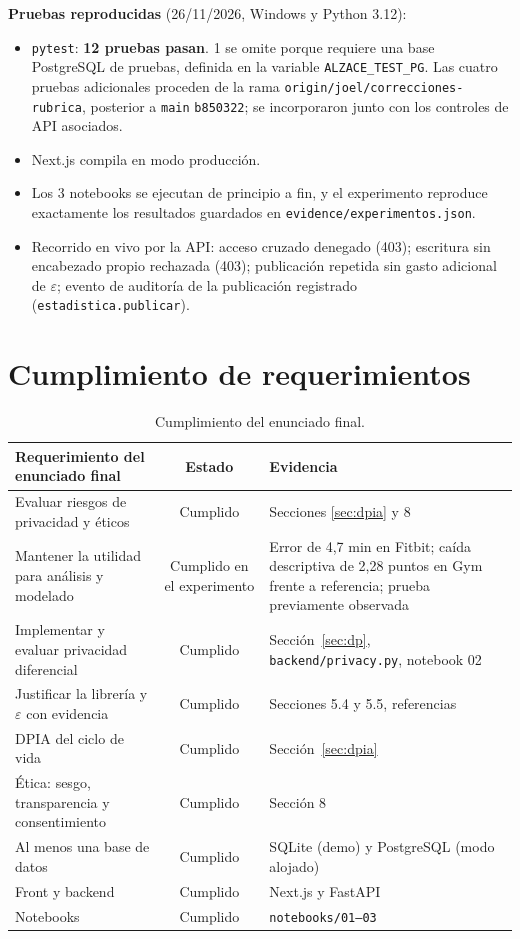 \documentclass[11pt]{article}
\begin{document}
\textbf{Pruebas reproducidas} (26/11/2026, Windows y Python 3.12):
\begin{itemize}[nosep]
  \item \texttt{pytest}: \textbf{12 pruebas pasan}. 1 se omite porque requiere una base PostgreSQL de pruebas, definida en la variable \texttt{ALZACE\_TEST\_PG}. Las cuatro pruebas adicionales proceden de la rama \texttt{origin/joel/correcciones-rubrica}, posterior a \texttt{main} \texttt{b850322}; se incorporaron junto con los controles de API asociados.
  \item Next.js compila en modo producción.
  \item Los 3 notebooks se ejecutan de principio a fin, y el experimento reproduce exactamente los resultados guardados en \texttt{evidence/experimentos.json}.
  \item Recorrido en vivo por la API: acceso cruzado denegado (403); escritura sin encabezado propio rechazada (403); publicación repetida sin gasto adicional de $\varepsilon$; evento de auditoría de la publicación registrado (\texttt{estadistica.\allowbreak publicar}).
\end{itemize}

\section{Cumplimiento de requerimientos}
\label{sec:cumplimiento}

\begin{table}[H]
\centering\small
\begin{tabularx}{\textwidth}{@{}p{6cm}cY@{}}
\toprule
\textbf{Requerimiento del enunciado final} & \textbf{Estado} & \textbf{Evidencia} \\
\midrule
Evaluar riesgos de privacidad y éticos & Cumplido & Secciones \ref{sec:dpia} y 8 \\
Mantener la utilidad para análisis y modelado & Cumplido en el experimento & Error de 4,7 min en Fitbit; caída descriptiva de 2,28 puntos en Gym frente a referencia; prueba previamente observada \\
Implementar y evaluar privacidad diferencial & Cumplido & Sección~\ref{sec:dp}, \texttt{backend/privacy.py}, notebook 02 \\
Justificar la librería y $\varepsilon$ con evidencia & Cumplido & Secciones 5.4 y 5.5, referencias \\
DPIA del ciclo de vida & Cumplido & Sección~\ref{sec:dpia} \\
Ética: sesgo, transparencia y consentimiento & Cumplido & Sección 8 \\
Al menos una base de datos & Cumplido & SQLite (demo) y PostgreSQL (modo alojado) \\
Front y backend & Cumplido & Next.js y FastAPI \\
Notebooks & Cumplido & \texttt{notebooks/01--03} \\
\bottomrule
\end{tabularx}
\caption{Cumplimiento del enunciado final.}
\end{table}
\end{document}
